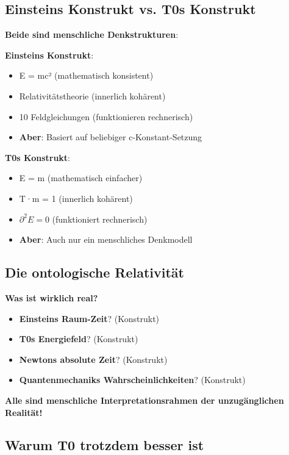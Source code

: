 \documentclass[12pt,a4paper]{article}
\begin{document}
	\subsection{Einsteins Konstrukt vs. T0s Konstrukt}
	
	\textbf{Beide sind menschliche Denkstrukturen}:
	
	\textbf{Einsteins Konstrukt}:
	\begin{itemize}
		\item E = mc² (mathematisch konsistent)
		\item Relativitätstheorie (innerlich kohärent)
		\item 10 Feldgleichungen (funktionieren rechnerisch)
		\item \textbf{Aber}: Basiert auf beliebiger c-Konstant-Setzung
	\end{itemize}
	
	\textbf{T0s Konstrukt}:
	\begin{itemize}
		\item E = m (mathematisch einfacher)
		\item T·m = 1 (innerlich kohärent)
		\item $\partial^2 E = 0$ (funktioniert rechnerisch)
		\item \textbf{Aber}: Auch nur ein menschliches Denkmodell
	\end{itemize}
	
	\subsection{Die ontologische Relativität}
	
	\textbf{Was ist wirklich real?}
	\begin{itemize}
		\item \textbf{Einsteins Raum-Zeit}? (Konstrukt)
		\item \textbf{T0s Energiefeld}? (Konstrukt)
		\item \textbf{Newtons absolute Zeit}? (Konstrukt)
		\item \textbf{Quantenmechaniks Wahrscheinlichkeiten}? (Konstrukt)
	\end{itemize}
	
	\textbf{Alle sind menschliche Interpretationsrahmen der unzugänglichen Realität!}
	
	\subsection{Warum T0 trotzdem besser ist}
	
\end{document}
